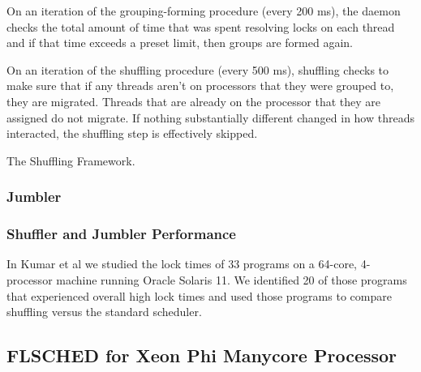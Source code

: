 \documentclass{sig-alternate}
\begin{document}
On an iteration of the grouping-forming procedure (every 200 ms), the daemon checks the total amount of time that was spent resolving locks on each thread and if that time exceeds a preset limit, then groups are formed again.

On an iteration of the shuffling procedure (every 500 ms), shuffling checks to make sure that if any threads aren't on processors that they were grouped to, they are migrated. Threads that are already on the processor that they are assigned do not migrate. If nothing substantially different changed in how threads interacted, the shuffling step is effectively skipped.\cite{KumarEtal:2014}

\begin{algorithm}


	\caption{The Shuffling Framework.}\label{euclid}\label{alg:shuffler}
\end{algorithm}

\subsubsection{Jumbler}
\label{sec:jumbler}



\subsubsection{Shuffler and Jumbler Performance}
\label{sec:sj_performance}

In Kumar et al we studied the lock times of 33 programs on a 64-core, 4-processor machine running Oracle Solaris 11. We identified 20 of those programs that experienced overall high lock times and used those programs to compare shuffling versus the standard scheduler.



\subsection{FLSCHED for Xeon Phi Manycore Processor}
\label{sec:flsched}
\end{document}
